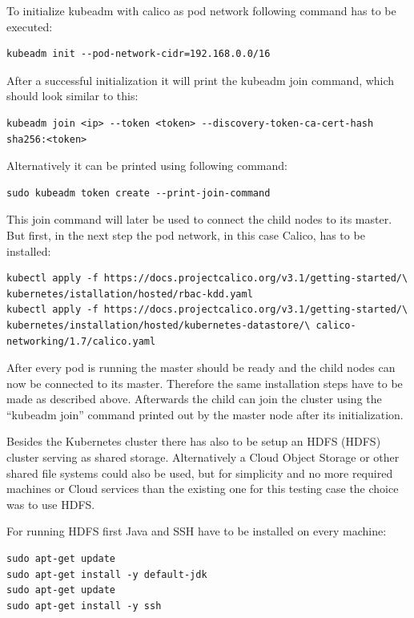 To initialize kubeadm with calico as pod network following command has to be executed:
\begin{lstlisting}[caption={Initialize Kubernetes master},captionpos=b]
kubeadm init --pod-network-cidr=192.168.0.0/16
\end{lstlisting}
After a successful initialization it will print the kubeadm join command, which should look similar to this:
\begin{lstlisting}[caption={Kubernetes join command},captionpos=b]
kubeadm join <ip> --token <token> --discovery-token-ca-cert-hash sha256:<token>
\end{lstlisting}
Alternatively it can be printed using following command:
\begin{lstlisting}[caption={Kubernetes print join command},captionpos=b]
sudo kubeadm token create --print-join-command 
\end{lstlisting}
This join command will later be used to connect the child nodes to its master. But first, in the next step the pod network, in this case Calico, has to be installed:
\begin{lstlisting}[caption={Install pod network for Kubernetes cluster},captionpos=b]
kubectl apply -f https://docs.projectcalico.org/v3.1/getting-started/\ kubernetes/istallation/hosted/rbac-kdd.yaml
kubectl apply -f https://docs.projectcalico.org/v3.1/getting-started/\ kubernetes/installation/hosted/kubernetes-datastore/\ calico-networking/1.7/calico.yaml
\end{lstlisting}

After every pod is running the master should be ready and the child nodes can now be connected to its master. Therefore the same installation steps have to be made as described above. Afterwards the child can join the cluster using the ``kubeadm join'' command printed out by the master node after its initialization.

Besides the Kubernetes cluster there has also to be setup an \acs{HDFS} (\acl{HDFS}) cluster serving as shared storage. Alternatively a Cloud Object Storage or other shared file systems could also be used, but for simplicity and no more required machines or Cloud services than the existing one for this testing case the choice was to use HDFS.

For running HDFS first Java and \acs{SSH} have to be installed on every machine:
\begin{lstlisting}[caption={HDFS requirements installation},captionpos=b]
sudo apt-get update
sudo apt-get install -y default-jdk
sudo apt-get update
sudo apt-get install -y ssh
\end{lstlisting}

